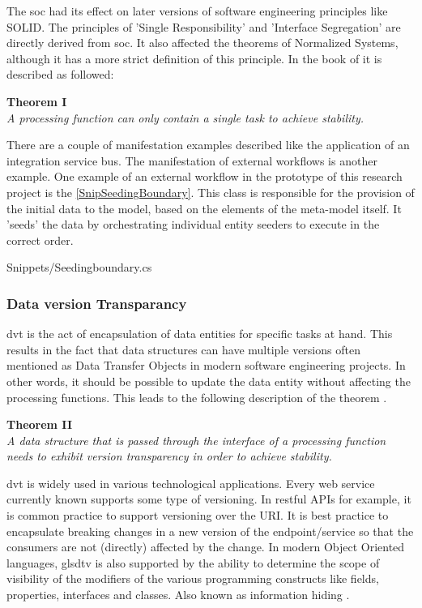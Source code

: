 The \gls{soc} had its effect on later versions of software engineering principles like SOLID.
The principles of 'Single Responsibility' and 'Interface Segregation' are directly derived
from \gls{soc}. It also affected the theorems of Normalized Systems, although it has a more
strict definition of this principle. In the book of \citeauthor{mannaert_normalized_2016}
it is described as followed: 

\begin{center}
    \textbf{Theorem I}\\
    \textit{A processing function can only contain a single task to achieve stability.}    
\end{center}


There are a couple of manifestation examples described like the application of an
integration service bus. The manifestation of external workflows is another example. One
example of an external workflow in the prototype of this research project is the
\ref{SnipSeedingBoundary}. This class is responsible for the provision of the initial data
to the model, based on the elements of the meta-model itself. It 'seeds' the data by
orchestrating individual entity seeders to execute in the correct order.


    {Snippets/Seedingboundary.cs}

\subsubsection{Data version Transparancy}
\gls{dvt} is the act of encapsulation of data entities for specific tasks at hand. This
results in the fact that data structures can have multiple versions often mentioned as
Data Transfer Objects in modern software engineering projects. In other words, it should
be possible to update the data entity without affecting the processing functions. This
leads to the following description of the theorem \parencite[280]{mannaert_normalized_2016}.

\begin{center}
    \textbf{Theorem II}\\
    \textit{A data structure that is passed through the interface of a processing function 
    needs to exhibit version transparency in order to achieve stability.}
\end{center}

\gls{dvt} is widely used in various technological applications. Every web service
currently known supports some type of versioning. In restful APIs for example, it is
common practice to support versioning over the URI. It is best practice to encapsulate
breaking changes in a new version of the endpoint/service so that the consumers are not
(directly) affected by the change. In modern Object Oriented languages, gls{dtv} is also
supported by the ability to determine the scope of visibility of the modifiers of the
various programming constructs like fields, properties, interfaces and classes. Also known
as information hiding \parencites{parnas_criteria_1972}[278]{mannaert_normalized_2016}.

